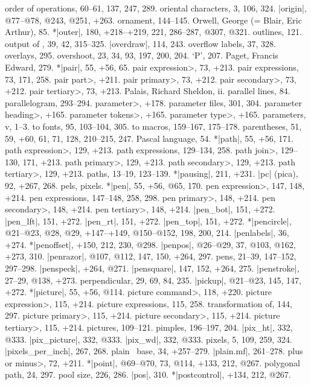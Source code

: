 order of operations, 60--61, 137, 247, 289.
oriental characters, 3, 106, 324.
|origin|, @77--@78, @243, @251, +263.
ornament, 144--145.
Orwell, George (= Blair, Eric Arthur), 85.
*|outer|, 180, +218--+219, 221, 286--287, @307, @321.
outlines, 121.
output of \MF, 39, 42, 315--325.
|overdraw|, 114, 243.
overflow labels, 37, 328.
overlays, 295.
overshoot, 23, 34, 93, 197, 200, 204.
\newletter
`P', 207.
Paget, Francis Edward, 279.
*|pair|, 55, +56, 65.
\<pair expression>, 73, +213.
pair expressions, 73, 171, 258.
\<pair part>, +211.
\<pair primary>, 73, +212.
\<pair secondary>, 73, +212.
\<pair tertiary>, 73, +213.
Palais, Richard Sheldon, ii.
parallel lines, 84.
parallelogram, 293--294.
\<parameter>, +178.
parameter files, 301, 304.
\<parameter heading>, +165.
\<parameter tokens>, +165.
\<parameter type>, +165.
parameters, v, 1--3.
\sub to fonts, 95, 103--104, 305.
\sub to macros, 159--167, 175--178.
parentheses, 51, 59, +60, 61, 71, 128, 210--215, 247.
Pascal language, 54.
*|path|, 55, +56, 171.
\<path expression>, 129, +213.
path expressions, 129--134, 258.
\<path join>, 129--130, 171, +213.
\<path primary>, 129, +213.
\<path secondary>, 129, +213.
\<path tertiary>, 129, +213.
paths, 13--19, 123--139.
*|pausing|, 211, +231.
|pc| (pica), 92, +267, 268.
pels, \see pixels.
*|pen|, 55, +56, @65, 170.
\<pen expression>, 147, 148, +214.
pen expressions, 147--148, 258, 298.
\<pen primary>, 148, +214.
\<pen secondary>, 148, +214.
\<pen tertiary>, 148, +214.
|pen_bot|, 151, +272.
|pen_lft|, 151, +272.
|pen_rt|, 151, +272.
|pen_top|, 151, +272.
*|pencircle|, @21--@23, @28, @29, +147--+149, @150--@152, 198, 200, 214.
|penlabels|, 36, +274.
*|penoffset|, +150, 212, 230, @298.
|penpos|, @26--@29, 37, @103, @162, +273, 310.
|penrazor|, @107, @112, 147, 150, +264, 297.
pens, 21--39, 147--152, 297--298.
|penspeck|, +264, @271.
|pensquare|, 147, 152, +264, 275.
|penstroke|, 27--29, @138, +273.
perpendicular, 29, 69, 84, 235.
|pickup|, @21--@23, 145, 147, +272.
*|picture|, 55, +56, @114.
\<picture command>, 118, +220.
\<picture expression>, 115, +214.
picture expressions, 115, 258.
\sub transformation of, 144, 297.
\<picture primary>, 115, +214.
\<picture secondary>, 115, +214.
\<picture tertiary>, 115, +214.
pictures, 109--121.
pimples, 196--197, 204.
|pix_ht|, 332, @333.
|pix_picture|, 332, @333.
|pix_wd|, 332, @333.
pixels, 5, 109, 259, 324.
|pixels_per_inch|, 267, 268.
plain \MF\ base, 34, +257--279.
|plain.mf|, 261--278.
\<plus or minus>, 72, +211.
*|point|, @69--@70, 73, @114, +133, 212, @267.
polygonal path, 24, 297.
pool size, 226, 286.
|pos|, 310.
*|postcontrol|, +134, 212, @267.
